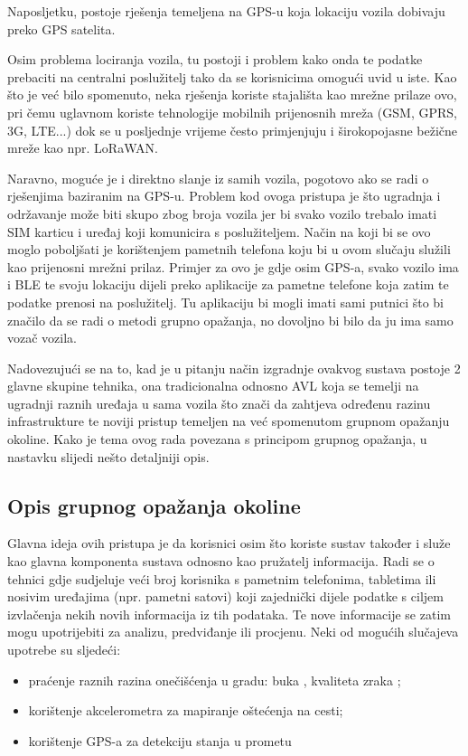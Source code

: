 \documentclass[times, utf8, diplomski]{fer}
\begin{document}
Naposljetku, postoje rješenja temeljena na GPS-u koja lokaciju vozila dobivaju preko GPS satelita.

Osim problema lociranja vozila, tu postoji i problem kako onda te podatke prebaciti na centralni poslužitelj tako da se korisnicima omogući uvid u iste. Kao što je već bilo spomenuto, neka rješenja koriste stajališta kao mrežne prilaze ovo, pri čemu uglavnom koriste tehnologije mobilnih prijenosnih mreža (GSM, GPRS, 3G, LTE...) dok se u posljednje vrijeme često primjenjuju i širokopojasne bežične mreže kao npr. LoRaWAN.

Naravno, moguće je i direktno slanje iz samih vozila, pogotovo ako se radi o rješenjima baziranim na GPS-u. Problem kod ovoga pristupa je što ugradnja i održavanje može biti skupo zbog broja vozila jer bi svako vozilo trebalo imati SIM karticu i uređaj koji komunicira s poslužiteljem. Način na koji bi se ovo moglo poboljšati je korištenjem pametnih telefona koju bi u ovom slučaju služili kao prijenosni mrežni prilaz. Primjer za ovo je \cite{ble_smartphone} gdje osim GPS-a, svako vozilo ima i BLE te svoju lokaciju dijeli preko aplikacije za pametne telefone koja zatim te podatke prenosi na poslužitelj. Tu aplikaciju bi mogli imati sami putnici što bi značilo da se radi o metodi grupno opažanja, no dovoljno bi bilo da ju ima samo vozač vozila.

Nadovezujući se na to, kad je u pitanju način izgradnje ovakvog sustava postoje 2 glavne skupine tehnika, ona tradicionalna odnosno AVL  koja se temelji na ugradnji raznih uređaja u sama vozila što znači da zahtjeva određenu razinu infrastrukture te noviji pristup temeljen na već spomenutom grupnom opažanju okoline. Kako je tema ovog rada povezana s principom grupnog opažanja, u nastavku slijedi nešto detaljniji opis.

\subsection{Opis grupnog opažanja okoline}
Glavna ideja ovih pristupa je da korisnici osim što koriste sustav također i služe kao glavna komponenta sustava odnosno kao pružatelj informacija.
Radi se o tehnici gdje sudjeluje veći broj korisnika s pametnim telefonima, tabletima ili nosivim uređajima (npr. pametni satovi) koji zajednički dijele podatke s ciljem izvlačenja nekih novih informacija iz tih podataka. Te nove informacije se zatim mogu upotrijebiti za analizu, predviđanje ili procjenu. Neki od mogućih slučajeva upotrebe su sljedeći:
\begin{itemize}
    \item praćenje raznih razina onečišćenja  u gradu: buka , kvaliteta zraka ;
    \item korištenje akcelerometra za mapiranje oštećenja na cesti;
    \item korištenje GPS-a za detekciju stanja u prometu
\end{itemize}
\end{document}
